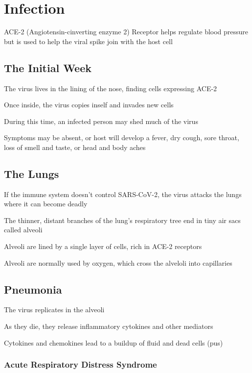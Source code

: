 \documentclass{notes}
\begin{document}
\section{Infection}

ACE-2 (Angiotensin-cinverting enzyme 2) Receptor helps regulate blood pressure but is used to help the viral spike join with the host cell

\subsection{The Initial Week}

The virus lives in the lining of the nose, finding cells expressing ACE-2

Once inside, the virus copies inself and invades new cells

\tab During this time, an infected person may shed much of the virus

Symptoms may be absent, or host will develop a fever, dry cough, sore throat, loss of smell and taste, or head and body aches

\subsection{The Lungs}

If the immune system doesn't control SARS-CoV-2, the virus attacks the lungs where it can become deadly

The thinner, distant branches of the lung's respiratory tree end in tiny air sacs called alveoli

\tab Alveoli are lined by a single layer of cells, rich in ACE-2 receptors

\tab Alveoli are normally used by oxygen, which cross the alveloli into capillaries

\subsection{Pneumonia}

The virus replicates in the alveoli

\tab \indicates As they die, they release inflammatory cytokines and other mediators

\tab \indicates Cytokines and chemokines lead to a buildup of fluid and dead cells (pus)

\subsubsection{Acute Respiratory Distress Syndrome}
\end{document}
